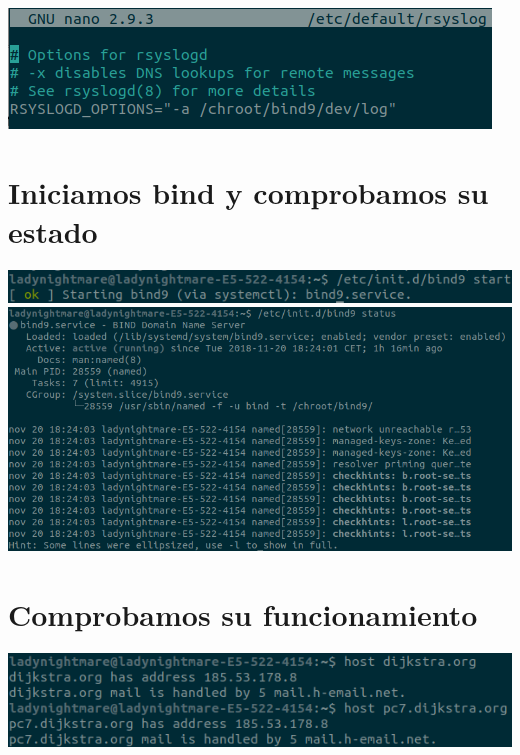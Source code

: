 \documentclass{article}
\begin{document}
\begin{center}
	\includegraphics[scale=0.5]{rsyslog.png} 
\end{center}

\section{Iniciamos bind y comprobamos su estado}

\begin{center}
	\includegraphics[scale=0.5]{startDemon.png}
	\includegraphics[scale=0.5]{statusDemon.png} 
\end{center}

\section{Comprobamos su funcionamiento}

\begin{center}
	\includegraphics[scale=0.5]{hosts2.png} 
\end{center}
\end{document}
